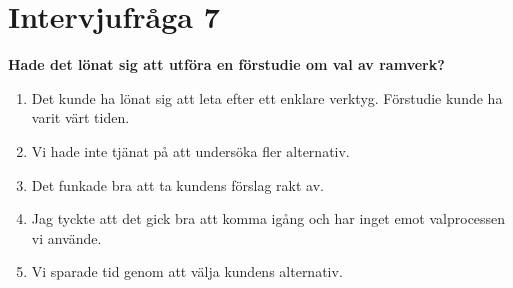 \section{Intervjufråga 7}
\textbf{Hade det lönat sig att utföra en förstudie om val av ramverk?}
\begin{enumerate}
\item Det kunde ha lönat sig att leta efter ett enklare verktyg. Förstudie kunde ha varit värt tiden.
\item Vi hade inte tjänat på att undersöka fler alternativ.
\item Det funkade bra att ta kundens förslag rakt av.
\item Jag tyckte att det gick bra att komma igång och har inget emot valprocessen vi använde.
\item Vi sparade tid genom att välja kundens alternativ.
\end{enumerate}